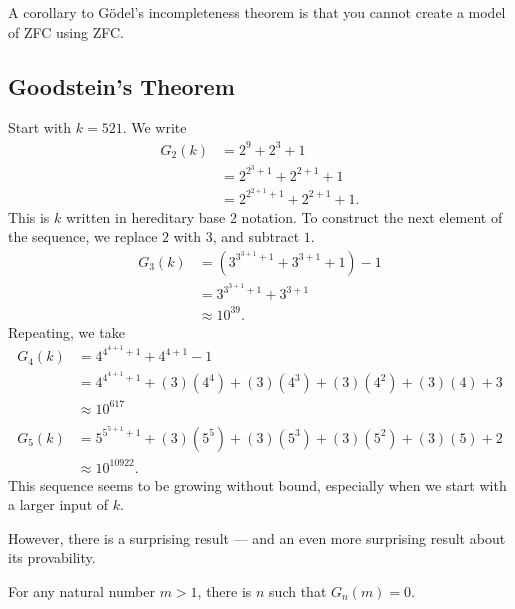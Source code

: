 \documentclass[10pt]{mypackage}
\begin{document}
\begin{remark}
  A corollary to Gödel's incompleteness theorem is that you cannot create a model of ZFC using ZFC.
\end{remark}

\subsection{Goodstein's Theorem}%
\begin{example}
  Start with $k = 521$. We write
  \begin{align*}
    G_2\left(k\right) &= 2^{9} + 2^{3} + 1\\
           &= 2^{2^3 + 1}+ 2^{2+1} + 1\\
           &= 2^{2^{2+1}+1} + 2^{2+1}+1.
  \end{align*}
  This is $k$ written in hereditary base 2 notation. To construct the next element of the sequence, we replace $2$ with $3$, and subtract $1$.
  \begin{align*}
    G_3\left(k\right) &= \left(3^{3^{3+1}+1} + 3^{3+1} + 1\right) - 1\\
                      &= 3^{3^{3+1}+1} + 3^{3+1}\\
                      &\approx 10^{39}.
  \end{align*}
  Repeating, we take
  \begin{align*}
    G_4\left(k\right) &= 4^{4^{4+1}+1} + 4^{4+1} - 1\\
                      &= 4^{4^{4+1}+1} + \left(3\right)\left(4^{4}\right) + \left(3\right)\left(4^{3}\right) + \left(3\right)\left(4^{2}\right) + \left(3\right)\left(4\right) + 3\\
                      &\approx 10^{617}\\
                      \\
    G_{5}\left(k\right) &= 5^{5^{5+1}+1} + \left(3\right)\left(5^{5}\right) + \left(3\right)\left(5^{3}\right) + \left(3\right)\left(5^2\right) + \left(3\right)\left(5\right) + 2\\
                        &\approx 10^{10922}.
  \end{align*}
  This sequence seems to be growing without bound, especially when we start with a larger input of $k$.
\end{example}
However, there is a surprising result --- and an even more surprising result about its provability.
\begin{theorem}
  For any natural number $m > 1$, there is $n$ such that $G_n\left(m\right) = 0$.
\end{theorem}
\end{document}
